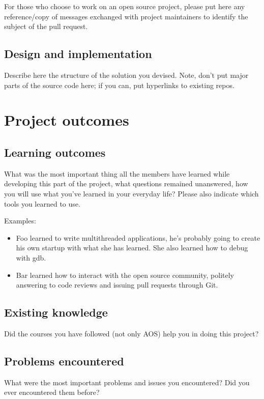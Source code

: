 \documentclass[10pt,a4]{article}
\begin{document}
For those who choose to work on an open source project, please put here any
reference/copy of messages exchanged with project maintainers to identify the subject
of the pull request.

\subsection{Design and implementation}
Describe here the structure of the solution you devised. Note, don't put major
parts of the source code here; if you can, put hyperlinks to existing repos.


\section{Project outcomes}


\subsection{Learning outcomes}

What was the most important thing all the members have learned while
developing this part of the project, what questions remained unanswered,
how you will use what you've learned in your everyday life?
Please also indicate which tools you learned to use.

Examples:

\begin{itemize}
\item Foo learned to write multithreaded applications, he's probably going to
  create his own startup with what she has learned. She also learned how to
  debug with gdb.
\item Bar learned how to interact with the open source community, politely
  answering to code reviews and issuing pull requests through Git.
\end{itemize}

\subsection{Existing knowledge}
Did the courses you have followed (not only AOS) help you in doing this project?

\subsection{Problems encountered}
What were the most important problems and issues you encountered? Did you ever
encountered them before? 
\end{document}
